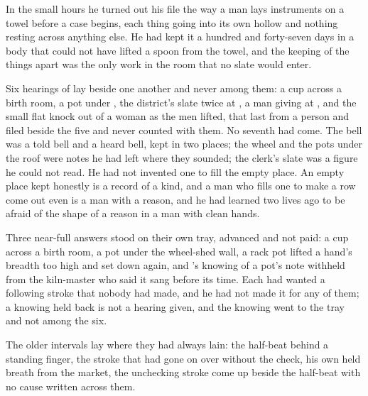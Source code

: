 \scenebreak

In the small hours he turned out his file the way a man lays instruments on a towel before a case begins, each thing going into its own hollow and nothing resting across anything else. He had kept it a hundred and forty-seven days in a body that could not have lifted a spoon from the towel, and the keeping of the things apart was the only work in the room that no slate would enter.

Six hearings of  lay beside one another and never among them: a cup across a birth room, a pot under , the district's slate twice at , a man giving at , and the small flat knock out of a woman as the men lifted, that last from a person and filed beside the five and never counted with them. No seventh had come. The bell was a told bell and a heard bell, kept in two places; the wheel and the pots under the roof were notes he had left where they sounded; the clerk's slate was a figure he could not read. He had not invented one to fill the empty place. An empty place kept honestly is a record of a kind, and a man who fills one to make a row come out even is a man with a reason, and he had learned two lives ago to be afraid of the shape of a reason in a man with clean hands.

Three near-full answers stood on their own tray, advanced and not paid: a cup across a birth room, a pot under the wheel-shed wall, a rack pot lifted a hand's breadth too high and set down again, and 's knowing of a pot's note withheld from the kiln-master who said it sang before its time. Each had wanted a following stroke that nobody had made, and he had not made it for any of them; a knowing held back is not a hearing given, and the knowing went to the tray and not among the six.

The older intervals lay where they had always lain: the half-beat behind a standing finger, the stroke that had gone on over  without the check, his own held breath from the market, the unchecking stroke come up beside the half-beat with no cause written across them.

